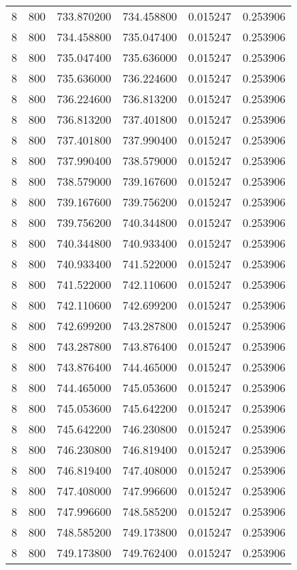 \begin{longtable}{rrrrrr}
8 & 800 & 733.870200 & 734.458800 & 0.015247 & 0.253906 \\
8 & 800 & 734.458800 & 735.047400 & 0.015247 & 0.253906 \\
8 & 800 & 735.047400 & 735.636000 & 0.015247 & 0.253906 \\
8 & 800 & 735.636000 & 736.224600 & 0.015247 & 0.253906 \\
8 & 800 & 736.224600 & 736.813200 & 0.015247 & 0.253906 \\
8 & 800 & 736.813200 & 737.401800 & 0.015247 & 0.253906 \\
8 & 800 & 737.401800 & 737.990400 & 0.015247 & 0.253906 \\
8 & 800 & 737.990400 & 738.579000 & 0.015247 & 0.253906 \\
8 & 800 & 738.579000 & 739.167600 & 0.015247 & 0.253906 \\
8 & 800 & 739.167600 & 739.756200 & 0.015247 & 0.253906 \\
8 & 800 & 739.756200 & 740.344800 & 0.015247 & 0.253906 \\
8 & 800 & 740.344800 & 740.933400 & 0.015247 & 0.253906 \\
8 & 800 & 740.933400 & 741.522000 & 0.015247 & 0.253906 \\
8 & 800 & 741.522000 & 742.110600 & 0.015247 & 0.253906 \\
8 & 800 & 742.110600 & 742.699200 & 0.015247 & 0.253906 \\
8 & 800 & 742.699200 & 743.287800 & 0.015247 & 0.253906 \\
8 & 800 & 743.287800 & 743.876400 & 0.015247 & 0.253906 \\
8 & 800 & 743.876400 & 744.465000 & 0.015247 & 0.253906 \\
8 & 800 & 744.465000 & 745.053600 & 0.015247 & 0.253906 \\
8 & 800 & 745.053600 & 745.642200 & 0.015247 & 0.253906 \\
8 & 800 & 745.642200 & 746.230800 & 0.015247 & 0.253906 \\
8 & 800 & 746.230800 & 746.819400 & 0.015247 & 0.253906 \\
8 & 800 & 746.819400 & 747.408000 & 0.015247 & 0.253906 \\
8 & 800 & 747.408000 & 747.996600 & 0.015247 & 0.253906 \\
8 & 800 & 747.996600 & 748.585200 & 0.015247 & 0.253906 \\
8 & 800 & 748.585200 & 749.173800 & 0.015247 & 0.253906 \\
8 & 800 & 749.173800 & 749.762400 & 0.015247 & 0.253906 \\

\end{longtable}

